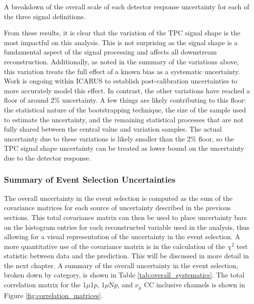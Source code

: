 \begin{table}
    \centering
    \caption{A breakdown of the overall scale of each detector response uncertainty for each of the three signal definitions.}
    
    \label{tab:detector_systematics}
\end{table}

From these results, it is clear that the variation of the TPC signal shape is the most impactful on this analysis. This is not surprising as the signal shape is a fundamental aspect of the signal processing and affects all downstream reconstruction. Additionally, as noted in the summary of the variations above, this variation treats the full effect of a known bias as a systematic uncertainty. Work is ongoing within ICARUS to establish post-calibration uncertainties to more accurately model this effect. In contrast, the other variations have reached a floor of around 2\% uncertainty. A few things are likely contributing to this floor: the statistical nature of the bootstrapping technique, the size of the sample used to estimate the uncertainty, and the remaining statistical processes that are not fully shared between the central value and variation samples. The actual uncertainty due to these variations is likely smaller than the 2\% floor, so the TPC signal shape uncertainty can be treated as lower bound on the uncertainty due to the detector response.

\subsubsection{Summary of Event Selection Uncertainties}
\label{sec:uncertainty_conclusion}

The overall uncertainty in the event selection is computed as the sum of the covariance matrices for each source of uncertainty described in the previous sections. This total covariance matrix can then be used to place uncertainty bars on the histogram entries for each reconstructed variable used in the analysis, thus allowing for a visual representation of the uncertainty in the event selection. A more quantitative use of the covariance matrix is in the calculation of the $\chi^2$ test statistic between data and the prediction. This will be discussed in more detail in the next chapter. A summary of the overall uncertainty in the event selection, broken down by category, is shown in Table \ref{tab:overall_systematics}. The total correlation matrix for the 1$\mu$1$p$, 1$\mu$N$p$, and $\nu_\mu$ CC inclusive channels is shown in Figure \ref{fig:correlation_matrices}.

